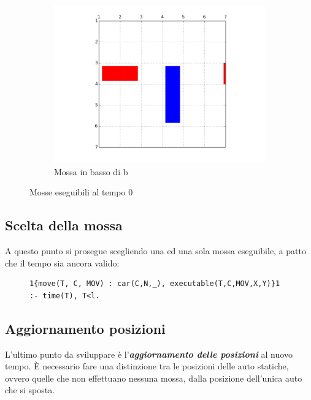 \documentclass[10pt, a4paper, oneside]{article}
\begin{document}
\begin{figure}[H]
\begin{subfigure}[b]{0.3\textwidth}
         \includegraphics[width=\textwidth]{images/b_down.png}
         \caption{Mossa in basso di b}
     \end{subfigure}
        \caption{Mosse eseguibili al tempo 0}
        \label{fig:mosse_exec}
\end{figure}







\subsection{Scelta della mossa}
A questo punto si prosegue scegliendo una ed una sola mossa eseguibile, a patto che il tempo sia ancora valido:

\begin{figure}[H]
\centering
\begin{verbatim}
1{move(T, C, MOV) : car(C,N,_), executable(T,C,MOV,X,Y)}1 :- time(T), T<l.
\end{verbatim}
\end{figure}



\subsection{Aggiornamento posizioni}
L'ultimo punto da sviluppare è l'\emph{\textbf{aggiornamento delle posizioni}} al nuovo tempo. È necessario fare una distinzione tra le posizioni delle auto statiche, ovvero quelle che non effettuano nessuna mossa, dalla posizione dell'unica auto che si sposta. \\
\end{document}
